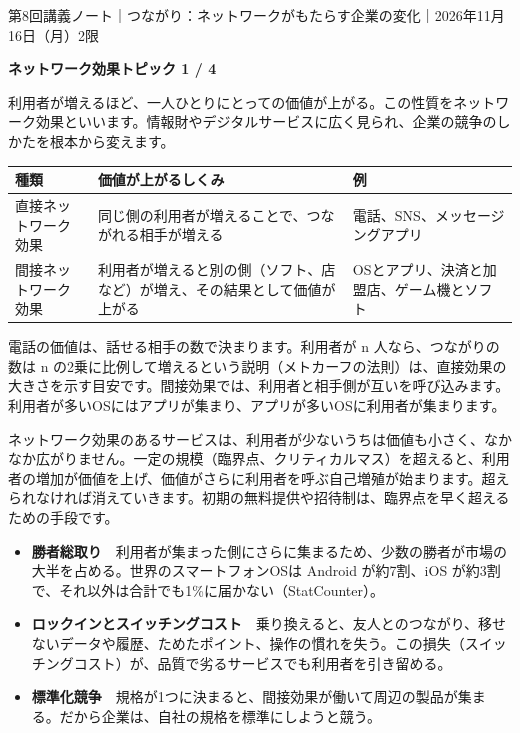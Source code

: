 \documentclass[paper=a4paper,fontsize=10pt,line_length=170mm,number_of_lines=46,baselineskip=1.6zw]{jlreq}
\newcommand\topichead[4]{%
  {\sffamily\footnotesize\color{grayt}#1\par}\vspace{1.5mm}
  {\sffamily\bfseries\LARGE #4}\hfill\colorbox{accent}{\sffamily\footnotesize\bfseries トピック #2 / #3}\par
  \vspace{1.2mm}{\color{ink}\hrule height 0.6pt}\vspace{3mm}}
\newcommand\subhead[1]{\par\vspace{2.6mm}{\sffamily\bfseries\large #1}\par\vspace{1.3mm}}
\begin{document}
\topichead{第8回講義ノート｜つながり：ネットワークがもたらす企業の変化｜2026年11月16日（月）2限}{1}{4}{ネットワーク効果}
利用者が増えるほど、一人ひとりにとっての価値が上がる。この性質をネットワーク効果といいます。情報財やデジタルサービスに広く見られ、企業の競争のしかたを根本から変えます。\par\vspace{1.2mm}
\subhead{直接と間接}
\begin{center}\small\renewcommand{\arraystretch}{1.15}\setlength{\tabcolsep}{1.5mm}
\begin{tabular}{|p{24.0mm}|p{68.0mm}|p{68.0mm}|}\arrayrulecolor{rulec}\hline
\rowcolor{papertwo}\sffamily\bfseries 種類 & \sffamily\bfseries 価値が上がるしくみ & \sffamily\bfseries 例\\\hline
直接ネットワーク効果 & 同じ側の利用者が増えることで、つながれる相手が増える & 電話、SNS、メッセージングアプリ\\\hline
間接ネットワーク効果 & 利用者が増えると別の側（ソフト、店など）が増え、その結果として価値が上がる & OSとアプリ、決済と加盟店、ゲーム機とソフト\\\hline
\end{tabular}\end{center}\vspace{0.5mm}
電話の価値は、話せる相手の数で決まります。利用者が n 人なら、つながりの数は n の2乗に比例して増えるという説明（メトカーフの法則）は、直接効果の大きさを示す目安です。間接効果では、利用者と相手側が互いを呼び込みます。利用者が多いOSにはアプリが集まり、アプリが多いOSに利用者が集まります。\par\vspace{1.2mm}
\subhead{臨界点を超えると何が起きるか}
ネットワーク効果のあるサービスは、利用者が少ないうちは価値も小さく、なかなか広がりません。一定の規模（臨界点、クリティカルマス）を超えると、利用者の増加が価値を上げ、価値がさらに利用者を呼ぶ自己増殖が始まります。超えられなければ消えていきます。初期の無料提供や招待制は、臨界点を早く超えるための手段です。\par\vspace{1.2mm}
\subhead{勝者総取り、ロックイン、標準化}
\begin{itemize}[leftmargin=1.5em,itemsep=0.6mm,topsep=0.3mm]
\item {\sffamily\bfseries 勝者総取り}　利用者が集まった側にさらに集まるため、少数の勝者が市場の大半を占める。世界のスマートフォンOSは Android が約7割、iOS が約3割で、それ以外は合計でも1\%に届かない（StatCounter）。
\item {\sffamily\bfseries ロックインとスイッチングコスト}　乗り換えると、友人とのつながり、移せないデータや履歴、ためたポイント、操作の慣れを失う。この損失（スイッチングコスト）が、品質で劣るサービスでも利用者を引き留める。
\item {\sffamily\bfseries 標準化競争}　規格が1つに決まると、間接効果が働いて周辺の製品が集まる。だから企業は、自社の規格を標準にしようと競う。
\end{itemize}\vspace{0.8mm}
\end{document}
